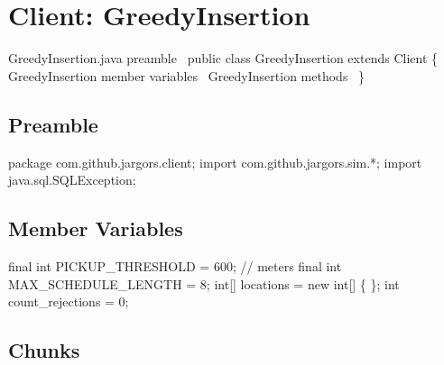 \nwenddocs{}\chapter{Client: GreedyInsertion}
\label{client-greedy}

\nwenddocs{}\endmoddef\nwstartdeflinemarkup\nwenddeflinemarkup
\LA{}GreedyInsertion.java preamble~{\nwtagstyle{}}\RA{}
public class GreedyInsertion extends Client \{
  \LA{}\code{}GreedyInsertion\edoc{} member variables~{\nwtagstyle{}}\RA{}
  \LA{}\code{}GreedyInsertion\edoc{} methods~{\nwtagstyle{}}\RA{}
\}
\nwendcode{}\nwdocspar

\section{Preamble}
\nwenddocs{}\endmoddef\nwstartdeflinemarkup{}\nwenddeflinemarkup
package com.github.jargors.client;
import com.github.jargors.sim.*;
import java.sql.SQLException;
\nwendcode{}\nwdocspar

\section{Member Variables}
\nwenddocs{}\endmoddef\nwstartdeflinemarkup{}\nwenddeflinemarkup
final int PICKUP_THRESHOLD = 600;  // meters
final int MAX_SCHEDULE_LENGTH = 8;
int[] locations = new int[] \{ \};
int count_rejections = 0;
\nwendcode{}\nwdocspar

\section{Chunks}

